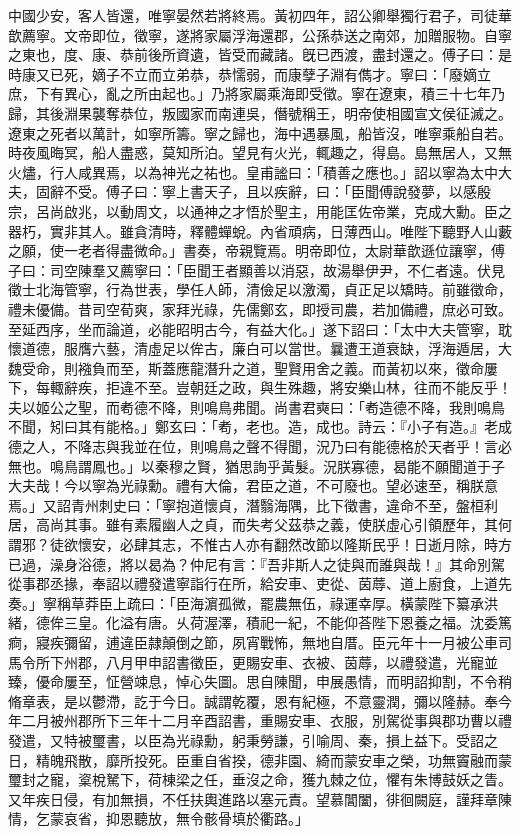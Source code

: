 \begin{pinyinscope}
中國少安，客人皆還，唯寧晏然若將終焉。黃初四年，詔公卿舉獨行君子，司徒華歆薦寧。文帝即位，徵寧，遂將家屬浮海還郡，公孫恭送之南郊，加贈服物。自寧之東也，度、康、恭前後所資遺，皆受而藏諸。旣已西渡，盡封還之。傅子曰：是時康又已死，嫡子不立而立弟恭，恭懦弱，而康孽子淵有儁才。寧曰：「廢嫡立庶，下有異心，亂之所由起也。」乃將家屬乘海即受徵。寧在遼東，積三十七年乃歸，其後淵果襲奪恭位，叛國家而南連吳，僭號稱王，明帝使相國宣文侯征滅之。遼東之死者以萬計，如寧所籌。寧之歸也，海中遇暴風，船皆沒，唯寧乘船自若。時夜風晦冥，船人盡惑，莫知所泊。望見有火光，輒趣之，得島。島無居人，又無火燼，行人咸異焉，以為神光之祐也。皇甫謐曰：「積善之應也。」詔以寧為太中大夫，固辭不受。傅子曰：寧上書天子，且以疾辭，曰：「臣聞傅說發夢，以感殷宗，呂尚啟兆，以動周文，以通神之才悟於聖主，用能匡佐帝業，克成大勳。臣之器朽，實非其人。雖貪清時，釋體蟬蛻。內省頑病，日薄西山。唯陛下聽野人山藪之願，使一老者得盡微命。」書奏，帝親覽焉。明帝即位，太尉華歆遜位讓寧，傅子曰：司空陳羣又薦寧曰：「臣聞王者顯善以消惡，故湯舉伊尹，不仁者遠。伏見徵士北海管寧，行為世表，學任人師，清儉足以激濁，貞正足以矯時。前雖徵命，禮未優備。昔司空荀爽，家拜光祿，先儒鄭玄，即授司農，若加備禮，庶必可致。至延西序，坐而論道，必能昭明古今，有益大化。」遂下詔曰：「太中大夫管寧，耽懷道德，服膺六藝，清虛足以侔古，廉白可以當世。曩遭王道衰缺，浮海遁居，大魏受命，則襁負而至，斯蓋應龍潛升之道，聖賢用舍之義。而黃初以來，徵命屢下，每輙辭疾，拒違不至。豈朝廷之政，與生殊趣，將安樂山林，往而不能反乎！夫以姬公之聖，而耇德不降，則鳴鳥弗聞。尚書君奭曰：「耇造德不降，我則鳴鳥不聞，矧曰其有能格。」鄭玄曰：「耇，老也。造，成也。詩云：『小子有造。』老成德之人，不降志與我並在位，則鳴鳥之聲不得聞，況乃曰有能德格於天者乎！言必無也。鳴鳥謂鳳也。」以秦穆之賢，猶思詢乎黃髮。況朕寡德，曷能不願聞道于子大夫哉！今以寧為光祿勳。禮有大倫，君臣之道，不可廢也。望必速至，稱朕意焉。」又詔青州刺史曰：「寧抱道懷貞，潛翳海隅，比下徵書，違命不至，盤桓利居，高尚其事。雖有素履幽人之貞，而失考父茲恭之義，使朕虛心引領歷年，其何謂邪？徒欲懷安，必肆其志，不惟古人亦有翻然改節以隆斯民乎！日逝月除，時方已過，澡身浴德，將以曷為？仲尼有言：『吾非斯人之徒與而誰與哉！』其命別駕從事郡丞掾，奉詔以禮發遣寧詣行在所，給安車、吏從、茵蓐、道上廚食，上道先奏。」寧稱草莽臣上疏曰：「臣海濵孤微，罷農無伍，祿運幸厚。橫蒙陛下纂承洪緒，德侔三皇。化溢有唐。乆荷渥澤，積祀一紀，不能仰荅陛下恩養之福。沈委篤痾，寢疾彌留，逋違臣隷顛倒之節，夙宵戰怖，無地自厝。臣元年十一月被公車司馬令所下州郡，八月甲申詔書徵臣，更賜安車、衣被、茵蓐，以禮發遣，光寵並臻，優命屢至，怔營竦息，悼心失圖。思自陳聞，申展愚情，而明詔抑割，不令稍脩章表，是以鬱滯，訖于今日。誠謂乾覆，恩有紀極，不意靈潤，彌以隆赫。奉今年二月被州郡所下三年十二月辛酉詔書，重賜安車、衣服，別駕從事與郡功曹以禮發遣，又特被璽書，以臣為光祿勳，躬秉勞謙，引喻周、秦，損上益下。受詔之日，精魄飛散，靡所投死。臣重自省揆，德非園、綺而蒙安車之榮，功無竇融而蒙璽封之寵，楶梲駑下，荷棟梁之任，垂沒之命，獲九棘之位，懼有朱博鼓妖之眚。又年疾日侵，有加無損，不任扶輿進路以塞元責。望慕閶闔，徘徊闕庭，謹拜章陳情，乞蒙哀省，抑恩聽放，無令骸骨填於衢路。」


\end{pinyinscope}
